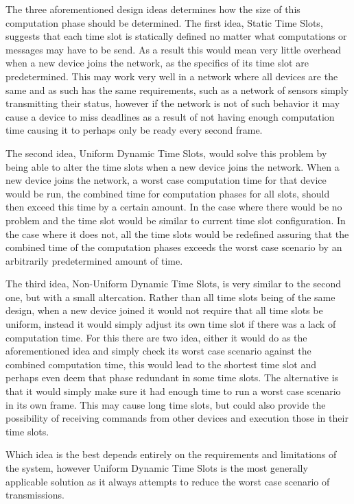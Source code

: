 \bigskip
\noindent The three aforementioned design ideas determines how the size of this computation phase should be determined.
The first idea, Static Time Slots, suggests that each time slot is statically defined no matter what computations or messages may have to be send.
As a result this would mean very little overhead when a new device joins the network, as the specifics of its time slot are predetermined.
This may work very well in a network where all devices are the same and as such has the same requirements, such as a network of sensors simply transmitting their status, however if the network is not of such behavior it may cause a device to miss deadlines as a result of not having enough computation time causing it to perhaps only be ready every second frame.

The second idea, Uniform Dynamic Time Slots, would solve this problem by being able to alter the time slots when a new device joins the network.
When a new device joins the network, a worst case computation time for that device would be run, the combined time for computation phases for all slots, should then exceed this time by a certain amount. 
In the case where there would be no problem and the time slot would be similar to current time slot configuration.
In the case where it does not, all the time slots would be redefined assuring that the combined time of the computation phases exceeds the worst case scenario by an arbitrarily predetermined amount of time.

The third idea, Non-Uniform Dynamic Time Slots, is very similar to the second one, but with a small altercation.
Rather than all time slots being of the same design, when a new device joined it would not require that all time slots be uniform, instead it would simply adjust its own time slot if there was a lack of computation time.
For this there are two idea, either it would do as the aforementioned idea and simply check its worst case scenario against the combined computation time, this would lead to the shortest time slot and perhaps even deem that phase redundant in some time slots.
The alternative is that it would simply make sure it had enough time to run a worst case scenario in its own frame.
This may cause long time slots, but could also provide the possibility of receiving commands from other devices and execution those in their time slots.

\bigskip
\noindent Which idea is the best depends entirely on the requirements and limitations of the system, however Uniform Dynamic Time Slots is the most generally applicable solution as it always attempts to reduce the worst case scenario of transmissions.
